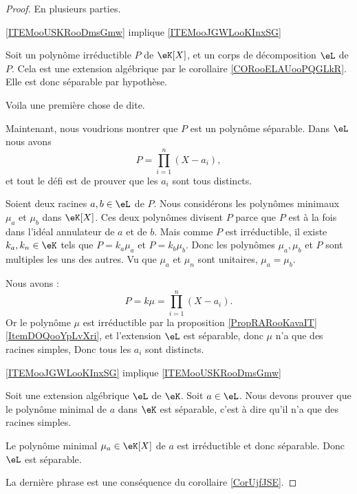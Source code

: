 \begin{proof}

    En plusieurs parties.

    \begin{subproof}
        \item[\ref{ITEMooUSKRooDmsGmw} implique \ref{ITEMooJGWLooKInxSG}]

            Soit un polynôme irréductible \( P\) de \( \eK[X]\), et un corps de décomposition \( \eL\) de \( P\). Cela est une extension algébrique par le corollaire \ref{CORooELAUooPQGLkR}. Elle est donc séparable par hypothèse.

            Voila une première chose de dite.

            Maintenant, nous voudrions montrer que \( P\) est un polynôme séparable. Dans \( \eL\) nous avons
            \begin{equation}
                P=\prod_{i=1}^n(X-a_i),
            \end{equation}
            et tout le défi est de prouver que les \( a_i\) sont tous distincts.
            
            Soient deux racines \( a,b\in \eL\) de \( P\). Nous considérons les polynômes minimaux \( \mu_a\) et \( \mu_b\) dans \( \eK[X]\). Ces deux polynômes divisent \( P\) parce que \( P\) est à la fois dans l'idéal annulateur de \( a\) et de \( b\). Mais comme \( P\) est irréductible, il existe \( k_a,k_n\in \eK\) tels que \( P=k_a\mu_a\) et \( P=k_b\mu_b\). Donc les polynômes \( \mu_a,\mu_b\) et \( P\) sont multiples les uns des autres. Vu que \( \mu_a\) et \( \mu_n\) sont unitaires, \( \mu_a=\mu_b\). 

            Nous avons :
            \begin{equation}
                P=k\mu=\prod_{i=1}^n(X-a_i).
            \end{equation}
            Or le polynôme \( \mu\) est irréductible par la proposition \ref{PropRARooKavaIT}\ref{ItemDOQooYpLvXri}, et l'extension \( \eL\) est séparable, donc \( \mu\) n'a que des racines simples, Donc tous les \( a_i\) sont distincts.

        \item[\ref{ITEMooJGWLooKInxSG} implique \ref{ITEMooUSKRooDmsGmw}]

            Soit une extension algébrique \( \eL\) de \( \eK\). Soit \( a\in \eL\). Nous devons prouver que le polynôme minimal de \( a\) dans \( \eK\) est séparable, c'est à dire qu'il n'a que des racines simples.

            Le polynôme minimal \( \mu_a\in \eK[X]\) de \( a\) est irréductible et donc séparable. Donc \( \eL\) est séparable.

    \end{subproof}

    La dernière phrase est une conséquence du corollaire \ref{CorUjfJSE}.
\end{proof}

